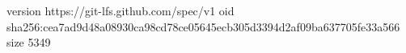 version https://git-lfs.github.com/spec/v1
oid sha256:cea7ad9d48a08930ca98cd78ce05645ecb305d3394d2af09ba637705fe33a566
size 5349
